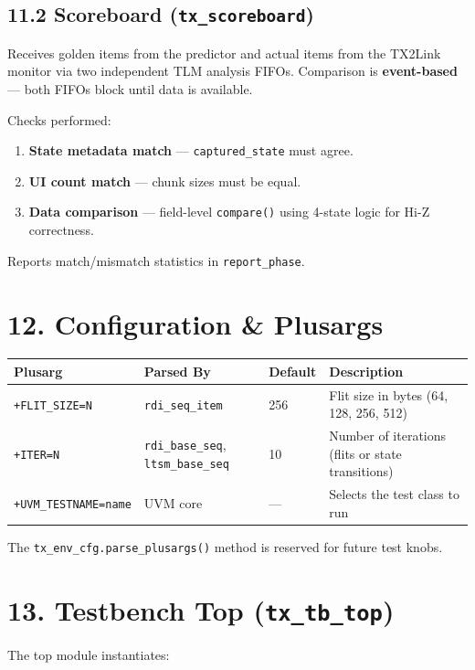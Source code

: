 \documentclass[11pt,a4paper]{article}
\begin{document}
\subsection{11.2 Scoreboard (\texttt{tx\_scoreboard})}

Receives golden items from the predictor and actual items from the TX2Link monitor via two independent TLM analysis FIFOs. Comparison is \textbf{event-based} --- both FIFOs block until data is available.

Checks performed:

\begin{enumerate}
  \item \textbf{State metadata match} --- \texttt{captured\_state} must agree.
  \item \textbf{UI count match} --- chunk sizes must be equal.
  \item \textbf{Data comparison} --- field-level \texttt{compare()} using 4-state logic for Hi-Z correctness.
\end{enumerate}


Reports match/mismatch statistics in \texttt{report\_phase}.


\section{12. Configuration \& Plusargs}


\begin{tabularx}{\textwidth}{|X|X|X|X|}
\hline
\textbf{Plusarg} & \textbf{Parsed By} & \textbf{Default} & \textbf{Description} \\
\hline
\texttt{+FLIT\_SIZE=N} & \texttt{rdi\_seq\_item} & 256 & Flit size in bytes (64, 128, 256, 512) \\
\hline
\texttt{+ITER=N} & \texttt{rdi\_base\_seq}, \texttt{ltsm\_base\_seq} & 10 & Number of iterations (flits or state transitions) \\
\hline
\texttt{+UVM\_TESTNAME=name} & UVM core & --- & Selects the test class to run \\
\hline
\end{tabularx}


The \texttt{tx\_env\_cfg.parse\_plusargs()} method is reserved for future test knobs.


\section{13. Testbench Top (\texttt{tx\_tb\_top})}

The top module instantiates:
\end{document}
